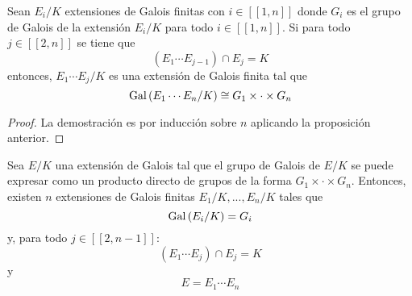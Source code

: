 \documentclass[12pt]{report}
\theoremstyle{largebreak}
\newcommand\natint[1]{\ensuremath{\left[\!\left[ #1\right]\!\right]}}
\begin{document}
    \begin{cor}
        Sean $E_i/K$ extensiones de Galois finitas con $i\in\natint{1,n}$ donde $G_i$ es el grupo de Galois de la extensión $E_i/K$ para todo $i\in\natint{1,n}$. Si para todo $j\in\natint{2,n}$ se tiene que
        \begin{equation*}
            (E_1\cdots E_{ j-1})\cap E_j=K
        \end{equation*}
        entonces, $E_1\cdots E_j/K$ es una extensión de Galois finita tal que
        \begin{equation*}
            \textup{Gal}\left(E_1\cdots E_n/K\right)\cong G_1\times\cdot\times G_n
        \end{equation*}
    \end{cor}

    \begin{proof}
        La demostración es por inducción sobre $n$ aplicando la proposición anterior.
    \end{proof}

    \begin{propo}
        Sea $E/K$ una extensión de Galois tal que el grupo de Galois de $E/K$ se puede expresar como un producto directo de grupos de la forma $G_1\times\cdot\times G_n$. Entonces, existen $n$ extensiones de Galois finitas $E_1/K,...,E_n/K$ tales que
        \begin{equation*}
            \textup{Gal}\left(E_i/K\right)=G_i
        \end{equation*}
        y, para todo $j\in\natint{2,n-1}$:
        \begin{equation*}
            (E_1\cdots E_{ j})\cap E_j=K
        \end{equation*}
        y
        \begin{equation*}
            E=E_1\cdots E_n
        \end{equation*}
    \end{propo}
\end{document}
